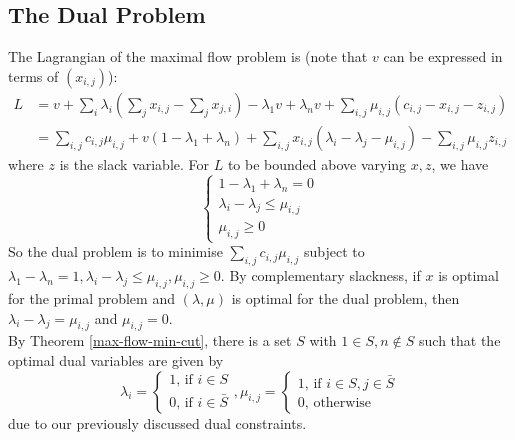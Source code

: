 \subsection{The Dual Problem}
The Lagrangian of the maximal flow problem is (note that $v$ can be expressed in terms of $(x_{i,j})$):
\begin{align*}
    L&=v+\sum_i\lambda_i\left( \sum_jx_{i,j}-\sum_jx_{j,i} \right)-\lambda_1v+\lambda_nv+\sum_{i,j}\mu_{i,j}(c_{i,j}-x_{i,j}-z_{i,j})\\
    &=\sum_{i,j}c_{i,j}\mu_{i,j}+v(1-\lambda_1+\lambda_n)+\sum_{i,j}x_{i,j}(\lambda_i-\lambda_j-\mu_{i,j})-\sum_{i,j}\mu_{i,j}z_{i,j}
\end{align*}
where $z$ is the slack variable.
For $L$ to be bounded above varying $x,z$, we have
$$\begin{cases}
    1-\lambda_1+\lambda_n=0\\
    \lambda_i-\lambda_j\le\mu_{i,j}\\
    \mu_{i,j}\ge 0
\end{cases}$$
So the dual problem is to minimise $\sum_{i,j}c_{i,j}\mu_{i,j}$ subject to $\lambda_1-\lambda_n=1,\lambda_i-\lambda_j\le\mu_{i,j},\mu_{i,j}\ge 0$.
By complementary slackness, if $x$ is optimal for the primal problem and $(\lambda,\mu)$ is optimal for the dual problem, then $\lambda_i-\lambda_j=\mu_{i,j}$ and $\mu_{i,j}=0$.\\
By Theorem \ref{max-flow-min-cut}, there is a set $S$ with $1\in S,n\notin S$ such that the optimal dual variables are given by
$$\lambda_i=\begin{cases}
    1\text{, if $i\in S$}\\
    0\text{, if $i\in\bar{S}$}
\end{cases},\mu_{i,j}=\begin{cases}
    1\text{, if $i\in S,j\in\bar{S}$}\\
    0\text{, otherwise}
\end{cases}$$
due to our previously discussed dual constraints.
